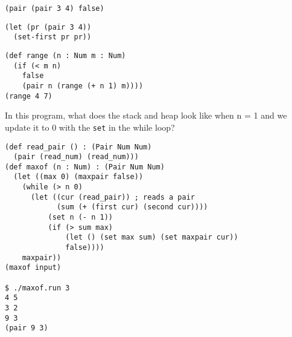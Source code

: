 \documentclass[10pt, oneside]{article}
\begin{document}
\begin{verbatim}
(pair (pair 3 4) false)
\end{verbatim}

\vfill

\begin{verbatim}
(let (pr (pair 3 4))
  (set-first pr pr))
\end{verbatim}

\vfill

\begin{verbatim}
(def range (n : Num m : Num)
  (if (< m n)
    false
    (pair n (range (+ n 1) m))))
(range 4 7)
\end{verbatim}

\vfill

\newpage

In this program, what does the stack and heap look like when n = 1 and we
update it to 0 with the {\tt set} in the while loop?

\begin{verbatim}
(def read_pair () : (Pair Num Num)
  (pair (read_num) (read_num)))
(def maxof (n : Num) : (Pair Num Num)
  (let ((max 0) (maxpair false))
    (while (> n 0)
      (let ((cur (read_pair)) ; reads a pair
            (sum (+ (first cur) (second cur))))
          (set n (- n 1))
          (if (> sum max)
              (let () (set max sum) (set maxpair cur))
              false))))
    maxpair))
(maxof input)

$ ./maxof.run 3
4 5
3 2
9 3
(pair 9 3)
\end{verbatim}
\end{document}
